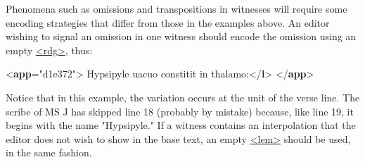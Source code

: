 Phenomena such as omissions and transpositions in witnesses will require some encoding strategies that differ from those in the examples above. An editor wishing to signal an omission in one witness should encode the omission using an empty \hyperref[TEI.rdg]{<rdg>}, thus: \par\bgroup{}\exampleFont \begin{shaded}\noindent\mbox{}{<\textbf{app}\hspace*{1em}{xml:id}="{d1e372}">}\mbox{}\newline 
{}\mbox{}\newline 
\hspace*{1em}Hypsipyle uacuo constitit in thalamo:{</\textbf{l}>}\mbox{}\newline 
{}\mbox{}\newline 
{}\mbox{}\newline 
{</\textbf{app}>}\end{shaded}\egroup\par \noindent  Notice that in this example, the variation occurs at the unit of the verse line. The scribe of MS J has skipped line 18 (probably by mistake) because, like line 19, it begins with the name "Hypsipyle." If a witness contains an interpolation that the editor does not wish to show in the base text, an empty \hyperref[TEI.lem]{<lem>} should be used, in the same fashion.\par
